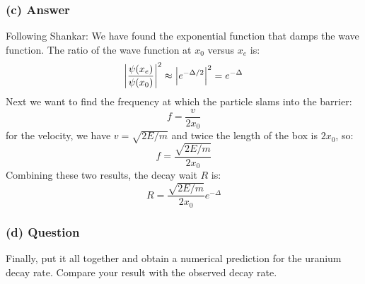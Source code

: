 \documentclass{article}
\begin{document}
\subsubsection*{(c) Answer}
Following Shankar:
We have found the exponential function that damps the wave function. The ratio of the wave function at $x_0$ versus $x_e$ is:
\begin{equation}
    \abs{\frac{\psi (x_e)}{\psi (x_0)}}^2 \approx \abs{e^{-\Delta /2}}^2 = e^{-\Delta }
\end{equation}
Next we want to find the frequency at which the particle slams into the barrier:
\begin{equation}
    f = \frac{v}{2x_0}
\end{equation}
for the velocity, we have $v = \sqrt{2E/m}$ and twice the length of the box is $2x_0$, so:
\begin{equation}
    f = \frac{\sqrt{2E/m}}{2x_0}
\end{equation}
Combining these two results, the decay wait $R$ is:
\begin{equation}
    R = \frac{\sqrt{2E/m}}{2x_0}e^{-\Delta }
\end{equation}


\subsubsection*{(d) Question}
Finally, put it all together and obtain a numerical prediction for the uranium decay rate. Compare your result with the observed decay rate.
\end{document}

